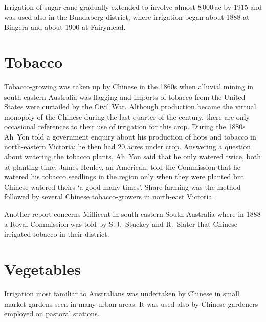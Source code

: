 Irrigation of sugar cane gradually extended to involve almost
8\,000\,ac by 1915 and was used also in the Bundaberg district, where
irrigation began about 1888 at Bingera and about 1900 at
Fairymead.

\section*{Tobacco}

Tobacco-growing was taken up by Chinese in the 1860s when alluvial
mining in south-eastern Australia was flagging and imports of tobacco
from the United States were curtailed by the Civil War.  Although
production became the virtual monopoly of the Chinese during the last
quarter of the century, there are only occasional references to their
use of irrigation for this crop.  During the 1880s Ah~Yon told a
government enquiry about his production of hops and tobacco in
north-eastern Victoria; he then had 20 acres under crop.  Answering a
question about watering the tobacco plants, Ah~Yon said that he only
watered twice, both at planting time.  James Henley, an American, told the
Commission that he watered his tobacco seedlings in the region only
when they were planted but Chinese watered theirs `a good many
times'.
Share-farming was the method followed by several Chinese
tobacco-growers in north-east Victoria.

Another report concerns Millicent in south-eastern South Australia
where in 1888 a Royal Commission was told by S.\,J.~Stuckey and
R.~Slater that Chinese irrigated tobacco in their
district.

\section*{Vegetables}

Irrigation most familiar to Australians was undertaken by Chinese in
small market gardens seen in many urban areas.  It was used also by
Chinese gardeners employed on pastoral stations.

